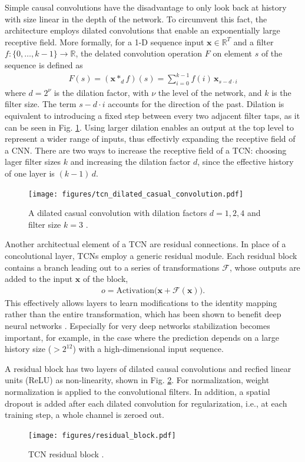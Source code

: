 \documentclass{scrartcl}
\begin{document}
Simple causal convolutions have the disadvantage to only look back at history with size linear in the depth of the network. To circumvent this fact, the architecture employs dilated convolutions that enable an exponentially large receptive field. More formally, for a 1-D sequence input $\mathbf x \in \mathbb R^T$ and a filter $f:\{ 0, \dots, k-1\} \rightarrow \mathbb R$, the delated convolution operation $F$ on element $s$ of the sequence is defined as
\begin{align}
F(s) = (\mathbf x *_d f)(s) = \sum_{i=0}^{k-1} f(i) \, \mathbf x_{s-d\cdot i}
\end{align}
where $d = 2^\nu$ is the dilation factor, with $\nu$ the level of the network, and $k$ is the filter size. The term $s-d\cdot i$ accounts for the direction of the past. Dilation is equivalent to introducing a fixed  step between every two adjacent filter taps, as it can be seen in Fig. \ref{fig:dilated_convolutions}. Using larger dilation enables an output at the top level to represent a wider range of inputs, thus effectivly expanding the receptive field of a CNN. There are two ways to increase the receptive field of a TCN: choosing lager filter sizes $k$ and increasing the dilation factor $d$, since the effective history of one layer is $(k-1) \, d$. 
\begin{figure}[htbp]
    \centering
    \texttt{[image: figures/tcn\_dilated\_casual\_convolution.pdf]}
    \caption{A dilated casual convolution with dilation factors $d = 1,2,4$ and filter size $k=3$ \cite{Bai2018}.}
    \label{fig:dilated_convolutions} 
\end{figure}

Another architectual element of a TCN are residual connections. In place of a concolutional layer, TCNs employ a generic residual module. Each residual block contains a branch leading out to a series of transformations $\mathcal F$, whose outputs are added to the input $\mathbf x$ of the block, 
\begin{align}
o = \text{Activation} \big(\mathbf x + \mathcal F(\mathbf x)\big).
\end{align}
This effectively allows layers to learn modifications to the identity mapping rather than the entire transformation, which has been shown to benefit deep neural networks \cite{He2016}. Especially for very deep networks stabilization becomes important, for example, in the case where the prediction depends on a large history size ($> 2^{12}$) with a high-dimensional input sequence. 

A residual block has two layers of dilated causal convolutions and recfied linear units (ReLU) as non-linearity, shown in Fig. \ref{fig:residual_block}. For normalization, weight normalization \cite{Salimans2016} is applied to the convolutional filters. In addition, a spatial dropout \cite{Srivastava2014} is added after each dilated convolution for regularization, i.e., at each training step, a whole channel is zeroed out.
\begin{figure}[htbp]
    \centering
    \texttt{[image: figures/residual\_block.pdf]}
    \caption{TCN residual block \cite{Bai2018}.}
    \label{fig:residual_block} 
\end{figure}
\end{document}

